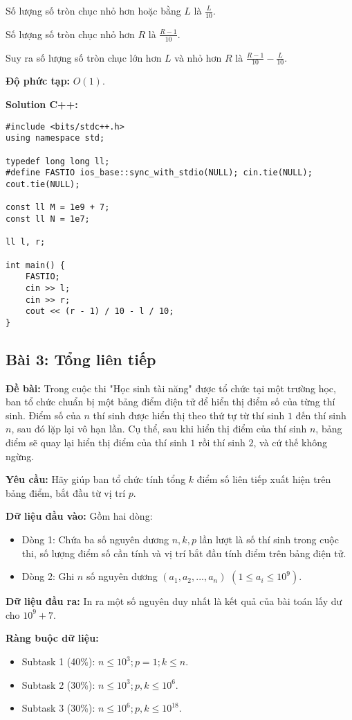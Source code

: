 \documentclass[12pt]{scrartcl}  %
\begin{document}
Số lượng số tròn chục nhỏ hơn hoặc bằng $L$ là $\frac{L}{10}$.

Số lượng số tròn chục nhỏ hơn $R$ là $\frac{R - 1}{10}$.

Suy ra số lượng số tròn chục lớn hơn $L$ và nhỏ hơn $R$ là $\frac{R - 1}{10} - \frac{L}{10}$.

\textbf{Độ phức tạp:} $O(1)$.

\textbf{Solution C++:}
\begin{lstlisting}
#include <bits/stdc++.h>
using namespace std;

typedef long long ll;
#define FASTIO ios_base::sync_with_stdio(NULL); cin.tie(NULL); cout.tie(NULL);

const ll M = 1e9 + 7;
const ll N = 1e7;

ll l, r;

int main() {
    FASTIO;
    cin >> l;
    cin >> r;
    cout << (r - 1) / 10 - l / 10;
}

\end{lstlisting}

\subsection{Bài 3: Tổng liên tiếp}
\textbf{Đề bài:}
Trong cuộc thi "Học sinh tài năng" được tổ chức tại một trường học, ban tổ chức chuẩn bị một
bảng điểm điện tử để hiển thị điểm số của từng thí sinh. Điểm số của $n$ thí sinh được hiển thị theo thứ
tự từ thí sinh $1$ đến thí sinh $n$, sau đó lặp lại vô hạn lần. Cụ thể, sau khi hiển thị điểm của thí sinh $n$,
bảng điểm sẽ quay lại hiển thị điểm của thí sinh $1$ rồi thí sinh $2$, và cứ thế không ngừng.

\textbf{Yêu cầu:}
Hãy giúp ban tổ chức tính tổng $k$ điểm số liên tiếp xuất hiện trên bảng điểm, bắt đầu từ vị trí $p$.

\textbf{Dữ liệu đầu vào:}
Gồm hai dòng:
\begin{itemize}
    \item Dòng 1: Chứa ba số nguyên dương $n, k, p$ lần lượt là số thí sinh trong cuộc thi, số lượng
điểm số cần tính và vị trí bắt đầu tính điểm trên bảng điện tử.
    \item Dòng 2: Ghi $n$ số nguyên dương $(a_1, a_2, ... , a_n)$ $(1 \leq a_i \leq 10^9)$.
\end{itemize}

\textbf{Dữ liệu đầu ra:}
In ra một số nguyên duy nhất là kết quả của bài toán lấy dư cho $10^9 + 7$.

\textbf{Ràng buộc dữ liệu:}
\begin{itemize}
    \item Subtask 1 (40\%): $n \leq 10^3; p = 1; k \leq n$.
    \item Subtask 2 (30\%): $n \leq 10^3; p, k \leq 10^6$.
    \item Subtask 3 (30\%): $n \leq 10^6; p, k \leq 10^{18}$.
\end{itemize}
\end{document}
